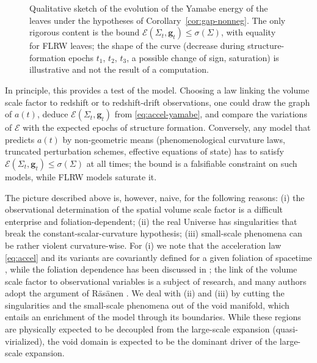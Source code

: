\documentclass[aps,prd,reprint,amsmath,amssymb,nofootinbib,longbibliography]{revtex4-2}
\newcommand{\g}{\mathbf{g}}                 %
\newcommand{\EH}{\mathcal{E}}               %
\theoremstyle{plain}
\theoremstyle{definition}
\theoremstyle{remark}
\begin{document}
\begin{figure}[tb]
\centering
{}
\caption{\label{fig:EH-evolution}Qualitative sketch of the evolution of the Yamabe energy of the leaves under the hypotheses of Corollary~\ref{cor:gap-nonneg}. The only rigorous content is the bound $\EH(\Sigma_t,\g_t)\le\sigma(\Sigma)$, with equality for FLRW leaves; the shape of the curve (decrease during structure-formation epochs $t_1$, $t_2$, $t_3$, a possible change of sign, saturation) is illustrative and not the result of a computation.}
\end{figure}

In principle, this provides a test of the model. Choosing a law linking the volume scale factor to redshift or to redshift-drift observations, one could draw the graph of $a(t)$, deduce $\EH(\Sigma_t,\g_t)$ from \eqref{eq:accel-yamabe}, and compare the variations of $\EH$ with the expected epochs of structure formation. Conversely, any model that predicts $a(t)$ by non-geometric means (phenomenological curvature laws, truncated perturbation schemes, effective equations of state) has to satisfy $\EH(\Sigma_t,\g_t)\le\sigma(\Sigma)$ at all times; the bound is a falsifiable constraint on such models, while FLRW models saturate it.

The picture described above is, however, naive, for the following reasons: (i) the observational determination of the spatial volume scale factor is a difficult enterprise and foliation-dependent; (ii) the real Universe has singularities that break the constant-scalar-curvature hypothesis; (iii) small-scale phenomena can be rather violent curvature-wise. For (i) we note that the acceleration law \eqref{eq:accel} and its variants are covariantly defined for a given foliation of spacetime \cite{heinesen2019covariance}, while the foliation dependence has been discussed in \cite{buchert2018cosmological}; the link of the volume scale factor to observational variables is a subject of research, and many authors adopt the argument of R\"as\"anen \cite{rasanen2009light}. We deal with (ii) and (iii) by cutting the singularities and the small-scale phenomena out of the void manifold, which entails an enrichment of the model through its boundaries. While these regions are physically expected to be decoupled from the large-scale expansion (quasi-virialized), the void domain is expected to be the dominant driver of the large-scale expansion.
\end{document}
